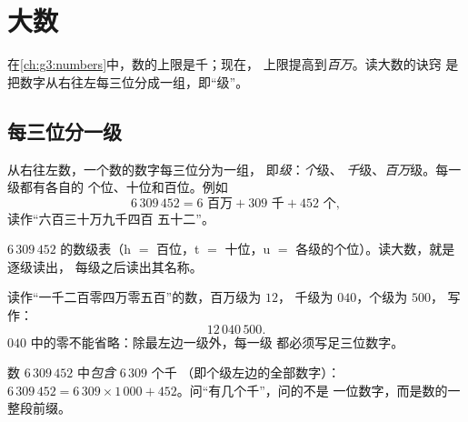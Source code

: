 \chapter{大数}\label{ch:g4:numbers}

在\cref{ch:g3:numbers}中，数的上限是千；现在，
上限提高到\emph{百万}。读大数的诀窍
是把数字从右往左每三位分成一组，即“级”。

\section{每三位分一级}

\begin{definition}[级]\label{def:g4:numbers:classes}
从右往左数，一个数的数字每三位分为一组，
即\emph{级}：\emph{个}级、
\emph{千}级、\emph{百万}级。每一级都有各自的
个位、十位和百位。例如
\[
6\,309\,452 = 6 \text{ 百万} + 309 \text{ 千}
+ 452 \text{ 个},
\]
读作“六百三十万九千四百
五十二”。
\end{definition}

\begin{omfigure}

{\small $6\,309\,452$ 的数级表（h $=$ 百位，t $=$
十位，u $=$ 各级的个位）。读大数，就是逐级读出，
每级之后读出其名称。}
\end{omfigure}

\begin{example}[用级写数]\label{ex:g4:numbers:write}
读作“一千二百零四万零五百”的数，百万级为 $12$，
千级为 $040$，个级为 $500$，
写作：
\[
12\,040\,500 .
\]
$040$ 中的零不能省略：除最左边一级外，每一级
都必须写足三位数字。
\end{example}

\begin{example}[有几个千？]\label{ex:g4:numbers:contained}
数 $6\,309\,452$ 中\emph{包含} $6\,309$ 个千
（即个级左边的全部数字）：$6\,309\,452 = 6\,309 \times
1\,000 + 452$。问“有几个千”，问的不是
一位数字，而是数的一整段前缀。
\end{example}

